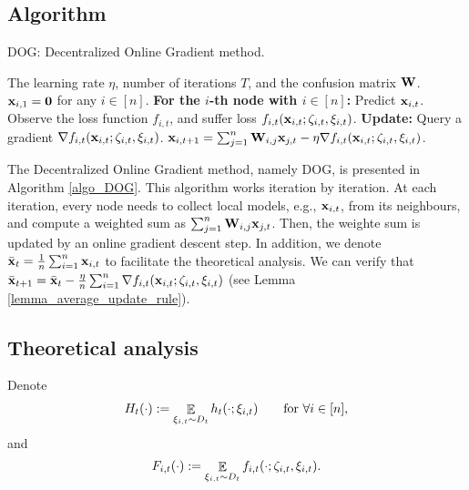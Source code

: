 \documentclass{article}
\begin{document}
\subsection{Algorithm}


\begin{algorithm}[!]
   \caption{\textsc{DOG}: Decentralized Online Gradient method.}
   \label{algo_DOG}
   \begin{algorithmic}[1]
   \REQUIRE The learning rate $\eta$, number of iterations $T$, and the confusion matrix ${\bf W}$. ${\bf x}_{i,1} = {\bf 0}$ for any $i\in [n]$.
            \STATE \textbf{For the $i$-th node with $i\in[n]$:}
            \STATE \indent Predict ${\bf x}_{i,t}$.
            \STATE \indent Observe the loss function $f_{i,t}$,  and suffer loss $f_{i,t}({\bf x}_{i,t};\zeta_{i,t},\xi_{i,t})$.
            \STATE \textbf{Update:}
            \STATE \indent Query a gradient $\nabla f_{i,t}({\bf x}_{i,t};\zeta_{i,t},\xi_{i,t})$.  
            \STATE \indent ${\bf x}_{i,t+1} = \sum_{j=1}^n {\bf W}_{i,j}{\bf x}_{j,t} - \eta \nabla f_{i,t}({\bf x}_{i,t};\zeta_{i,t},\xi_{i,t})$. 
       \ENDFOR
   \end{algorithmic}
\end{algorithm}


The Decentralized Online Gradient method, namely \textsc{DOG}, is presented in Algorithm \ref{algo_DOG}. This algorithm works iteration by iteration.
At each iteration, every node needs to collect local models, e.g., ${\bf x}_{i,t}$, from its neighbours, and compute a weighted sum as $ \sum_{j=1}^n {\bf W}_{i,j}{\bf x}_{j,t}$. Then, the weighte sum is updated by an online gradient descent step. In addition, we denote $\bar{{\bf x}}_t = \frac{1}{n}\sum_{i=1}^n {\bf x}_{i,t}$ to facilitate the theoretical analysis. We can verify that $\bar{{\bf x}}_{t+1} =  \bar{{\bf x}}_t -  \frac{\eta}{n}\sum_{i=1}^n \nabla f_{i,t}({\bf x}_{i,t};\zeta_{i,t},\xi_{i,t})$ (see Lemma \ref{lemma_average_update_rule}). 



\subsection{Theoretical analysis}
\label{subsection_theoretical_analysis}
Denote 
\begin{align}
\nonumber
H_t(\cdot) := \mathop{\mathbb{E}}_{\xi_{i,t} \sim D_t} h_t(\cdot; \xi_{i,t}) {~~~~~~} \text{for } \forall i\in[n],
\end{align} and 
\begin{align}
\nonumber
F_{i,t}(\cdot) := \mathop{\mathbb{E}}_{\xi_{i,t} \sim D_t} f_{i,t}(\cdot; \zeta_{i,t},\xi_{i,t}).
\end{align}
\end{document}
